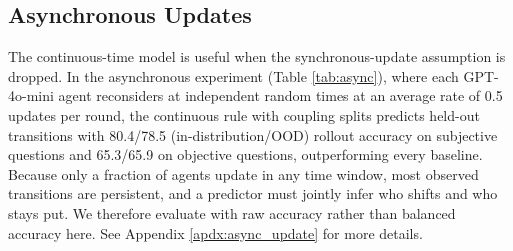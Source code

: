 \subsection{Asynchronous Updates}
The continuous-time model is useful when the synchronous-update assumption is dropped. In the asynchronous experiment (Table \ref{tab:async}), where each GPT-4o-mini agent reconsiders at independent random times at an average rate of 0.5 updates per round, the continuous rule with coupling splits predicts held-out transitions with 80.4/78.5 (in-distribution/OOD) rollout accuracy on subjective questions and 65.3/65.9 on objective questions, outperforming every baseline. Because only a fraction of agents update in any time window, most observed transitions are persistent, and a predictor must jointly infer who shifts and who stays put. We therefore evaluate with raw accuracy rather than balanced accuracy here. See Appendix \ref{apdx:async_update} for more details.%
